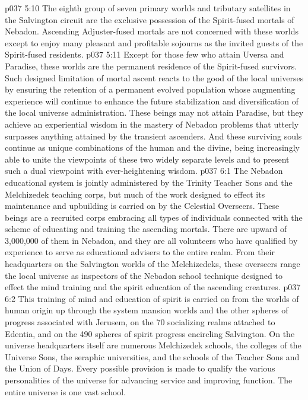 \vs p037 5:10 \pc {} The eighth group of seven primary worlds and tributary satellites in the Salvington circuit are the exclusive possession of the Spirit\hyp{}fused mortals of Nebadon. Ascending Adjuster\hyp{}fused mortals are not concerned with these worlds except to enjoy many pleasant and profitable sojourns as the invited guests of the Spirit\hyp{}fused residents.
\vs p037 5:11 Except for those few who attain Uversa and Paradise, these worlds are the permanent residence of the Spirit\hyp{}fused survivors. Such designed limitation of mortal ascent reacts to the good of the local universes by ensuring the retention of a permanent evolved population whose augmenting experience will continue to enhance the future stabilization and diversification of the local universe administration. These beings may not attain Paradise, but they achieve an experiential wisdom in the mastery of Nebadon problems that utterly surpasses anything attained by the transient ascenders. And these surviving souls continue as unique combinations of the human and the divine, being increasingly able to unite the viewpoints of these two widely separate levels and to present such a dual viewpoint with ever\hyp{}heightening wisdom.
\vs p037 6:1 The Nebadon educational system is jointly administered by the Trinity Teacher Sons and the Melchizedek teaching corps, but much of the work designed to effect its maintenance and upbuilding is carried on by the Celestial Overseers. These beings are a recruited corps embracing all types of individuals connected with the scheme of educating and training the ascending mortals. There are upward of 3,000,000 of them in Nebadon, and they are all volunteers who have qualified by experience to serve as educational advisers to the entire realm. From their headquarters on the Salvington worlds of the Melchizedeks, these overseers range the local universe as inspectors of the Nebadon school technique designed to effect the mind training and the spirit education of the ascending creatures.
\vs p037 6:2 This training of mind and education of spirit is carried on from the worlds of human origin up through the system mansion worlds and the other spheres of progress associated with Jerusem, on the 70 socializing realms attached to Edentia, and on the 490 spheres of spirit progress encircling Salvington. On the universe headquarters itself are numerous Melchizedek schools, the colleges of the Universe Sons, the seraphic universities, and the schools of the Teacher Sons and the Union of Days. Every possible provision is made to qualify the various personalities of the universe for advancing service and improving function. The entire universe is one vast school.
